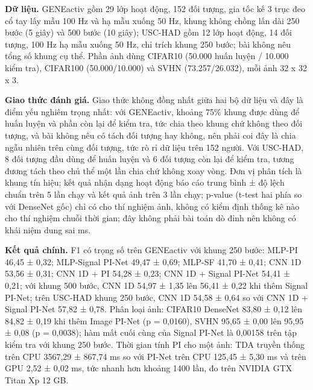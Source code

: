 \documentclass[12pt,a4paper]{article}
\begin{document}
\noindent \textbf{Dữ liệu.} GENEactiv gồm 29 lớp hoạt động, 152 đối tượng, gia tốc kế 3 trục đeo cổ tay lấy mẫu 100 Hz và hạ mẫu xuống 50 Hz, khung không chồng lấn dài 250 bước (5 giây) và 500 bước (10 giây); USC-HAD gồm 12 lớp hoạt động, 14 đối tượng, 100 Hz hạ mẫu xuống 50 Hz, chỉ trích khung 250 bước; bài không nêu tổng số khung cụ thể. Phần ảnh dùng CIFAR10 (50.000 huấn luyện / 10.000 kiểm tra), CIFAR100 (50.000/10.000) và SVHN (73.257/26.032), mỗi ảnh 32 x 32 x 3.\par\vspace{3pt}
\noindent \textbf{Giao thức đánh giá.} Giao thức không đồng nhất giữa hai bộ dữ liệu và đây là điểm yếu nghiêm trọng nhất: với GENEactiv, khoảng 75\% khung được dùng để huấn luyện và phần còn lại để kiểm tra, tức chia theo khung chứ không theo đối tượng, và bài không nêu có tách đối tượng hay không, nên phải coi đây là chia ngẫu nhiên trên cùng đối tượng, tức rò rỉ dữ liệu trên 152 người. Với USC-HAD, 8 đối tượng đầu dùng để huấn luyện và 6 đối tượng còn lại để kiểm tra, tương đương tách theo chủ thể một lần chia chứ không xoay vòng. Đơn vị phân tích là khung tín hiệu; kết quả nhận dạng hoạt động báo cáo trung bình ± độ lệch chuẩn trên 5 lần chạy và kết quả ảnh trên 3 lần chạy; p-value (t-test hai phía so với DenseNet gốc) chỉ có cho thí nghiệm ảnh, không có kiểm định thống kê nào cho thí nghiệm chuỗi thời gian; đây không phải bài toán dò đỉnh nên không có khái niệm dung sai ms.\par\vspace{3pt}
\noindent \textbf{Kết quả chính.} F1 có trọng số trên GENEactiv với khung 250 bước: MLP-PI 46,45 ± 0,32; MLP-Signal PI-Net 49,47 ± 0,69; MLP-SF 41,70 ± 0,41; CNN 1D 53,56 ± 0,31; CNN 1D + PI 54,28 ± 0,23; CNN 1D + Signal PI-Net 54,41 ± 0,21; với khung 500 bước, CNN 1D 54,97 ± 1,35 lên 56,41 ± 0,22 khi thêm Signal PI-Net; trên USC-HAD khung 250 bước, CNN 1D 54,58 ± 0,64 so với CNN 1D + Signal PI-Net 57,82 ± 0,78. Phân loại ảnh: CIFAR10 DenseNet 83,80 ± 0,12 lên 84,82 ± 0,19 khi thêm Image PI-Net (p = 0,0160), SVHN 95,65 ± 0,00 lên 95,95 ± 0,08 (p = 0,0038); hàm mất cuối cùng của Signal PI-Net là 0,00158 trên tập kiểm tra với khung 250 bước. Thời gian tính PI cho một ảnh: TDA truyền thống trên CPU 3567,29 ± 867,74 ms so với PI-Net trên CPU 125,45 ± 5,30 ms và trên GPU 2,52 ± 0,02 ms, tức nhanh hơn khoảng 1400 lần, đo trên NVIDIA GTX Titan Xp 12 GB.\par\vspace{3pt}
\end{document}
